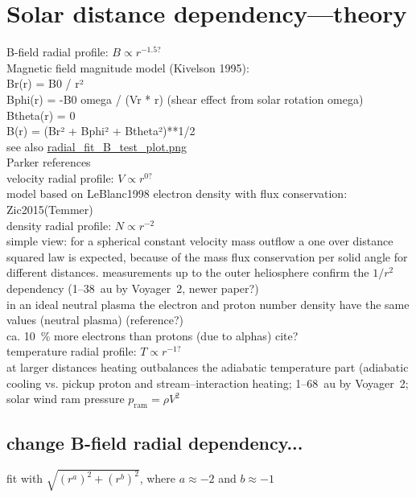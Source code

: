 \section{Solar distance dependency---theory}
B-field radial profile: $B \propto r^{-1.5?}$\\
	Magnetic field magnitude model (Kivelson 1995):\\
	Br(r) = B0 / r²\\
	Bphi(r) = -B0 omega / (Vr * r) (shear effect from solar rotation omega)\\
	Btheta(r) = 0\\
	B(r) = (Br² + Bphi² + Btheta²)**1/2\\
	see also \url{radial_fit_B_test_plot.png}\\
	Parker references\\
velocity radial profile: $V \propto r^{0?}$\\
	model based on LeBlanc1998 electron density with flux conservation: Zic2015(Temmer)\\
density radial profile: $N \propto r^{-2}$\\
	simple view: for a spherical constant velocity mass outflow a one over distance squared law is expected, because of the mass flux conservation per solid angle for different distances. measurements up to the outer heliosphere confirm the $1/r^2$ dependency (1--38~au by Voyager~2, \citep{Belcher1993} newer paper?)\\

	in an ideal neutral plasma the electron and proton number density have the same values (neutral plasma) (reference?)\\
	ca. 10~\% more electrons than protons (due to alphas) cite?\\	%
temperature radial profile: $T \propto r^{-1?}$\\
	at larger distances heating outbalances the adiabatic temperature part (adiabatic cooling vs. pickup proton and stream--interaction heating; 1--68~au by Voyager~2; \citet{Richardson2003}\\
solar wind ram pressure $p_\text{ram} = \rho V^2$\\


\subsection{change B-field radial dependency...}
fit with $\sqrt{(r^a)^2 + (r^b)^2}$, where $a \approx -2$ and $b \approx -1$\\


